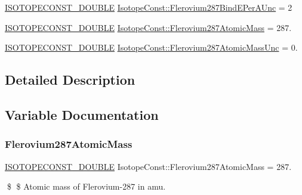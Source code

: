 \begin{DoxyCompactItemize}
\mbox{\hyperlink{group___isotope_const-_macros_ga8f45a7272ce02c0b4c65c44636ed719a}{I\+S\+O\+T\+O\+P\+E\+C\+O\+N\+S\+T\+\_\+\+D\+O\+U\+B\+LE}} \mbox{\hyperlink{group___isotope_const-_flerovium-_fl287_gaabb7b319905dca21e3db7a6fd10c4bf3}{Isotope\+Const\+::\+Flerovium287\+Bind\+E\+Per\+A\+Unc}} = 2
\item 
\mbox{\hyperlink{group___isotope_const-_macros_ga8f45a7272ce02c0b4c65c44636ed719a}{I\+S\+O\+T\+O\+P\+E\+C\+O\+N\+S\+T\+\_\+\+D\+O\+U\+B\+LE}} \mbox{\hyperlink{group___isotope_const-_flerovium-_fl287_ga97cd7682096228a2cab06dcdadf9cfb7}{Isotope\+Const\+::\+Flerovium287\+Atomic\+Mass}} = 287.
\item 
\mbox{\hyperlink{group___isotope_const-_macros_ga8f45a7272ce02c0b4c65c44636ed719a}{I\+S\+O\+T\+O\+P\+E\+C\+O\+N\+S\+T\+\_\+\+D\+O\+U\+B\+LE}} \mbox{\hyperlink{group___isotope_const-_flerovium-_fl287_gaf8009143857610175186e62bb1b03c98}{Isotope\+Const\+::\+Flerovium287\+Atomic\+Mass\+Unc}} = 0.
\end{DoxyCompactItemize}


\subsection{Detailed Description}


\subsection{Variable Documentation}
\mbox{\label{group___isotope_const-_flerovium-_fl287_ga97cd7682096228a2cab06dcdadf9cfb7}} 
\subsubsection{\texorpdfstring{Flerovium287\+Atomic\+Mass}{Flerovium287AtomicMass}}
{\footnotesize\ttfamily \mbox{\hyperlink{group___isotope_const-_macros_ga8f45a7272ce02c0b4c65c44636ed719a}{I\+S\+O\+T\+O\+P\+E\+C\+O\+N\+S\+T\+\_\+\+D\+O\+U\+B\+LE}} Isotope\+Const\+::\+Flerovium287\+Atomic\+Mass = 287.}

\$ \$ Atomic mass of Flerovium-\/287 in amu. \mbox{\label{group___isotope_const-_flerovium-_fl287_gaf8009143857610175186e62bb1b03c98}} 
